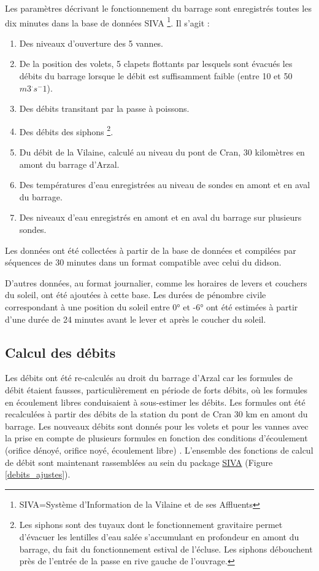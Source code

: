 \documentclass[11pt,twocolumn,titlepage,twoside]{article}
\begin{document}
Les paramètres décrivant le fonctionnement du barrage sont enregistrés toutes
les dix minutes dans la base de données SIVA \footnote{SIVA=Système
d'Information de la Vilaine et de ses Affluents}. Il s'agit :
\begin{enumerate}
\item Des niveaux d'ouverture des 5 vannes. 
\item De la position des volets, 5 clapets flottants par lesquels sont évacués
les débits du barrage lorsque le débit est suffisamment faible (entre 10 et 50 $m3^.s^-1$).
\item Des débits transitant par la
passe à poissons. 
\item Des débits des siphons \footnote{Les siphons sont des tuyaux dont le
fonctionnement gravitaire permet d'évacuer les lentilles d'eau salée
s'accumulant en profondeur en amont du barrage, du fait du fonctionnement
estival de l'écluse. Les siphons débouchent près de l'entrée de la passe en
rive gauche de l'ouvrage.}. 
\item Du débit de la Vilaine, calculé au niveau
du pont de Cran, 30 kilomètres en amont du barrage d'Arzal.
\item Des températures d'eau enregistrées au niveau de sondes en amont
et en aval du barrage.
\item Des niveaux d'eau enregistrés en amont et en aval du barrage sur plusieurs
sondes.
\end{enumerate}
Les données ont été collectées à partir de la base de données 
 et compilées par
séquences de 30 minutes dans un format compatible avec celui du didson.

D'autres données, au format journalier, comme les horaires de levers et couchers
du soleil, ont été ajoutées à cette base. Les durées de pénombre civile correspondant à une position
du soleil entre 0° et -6° ont été estimées à partir d'une durée de 24 minutes avant le lever 
et après le coucher du soleil.
\subsection{Calcul des débits}
Les débits ont été re-calculés au droit du barrage d'Arzal car les formules de
débit étaient fausses, particulièrement en période de forts débits, où
les formules en écoulement libres conduisaient à sous-estimer les
débits. Les formules ont été recalculées à partir des débits de la station du
pont de Cran 30 km en amont du barrage. Les nouveaux débits sont donnés pour les volets 
et pour les vannes avec la prise en compte de plusieurs formules en fonction des
conditions d'écoulement (orifice dénoyé, orifice noyé, écoulement libre)
\citep{briand_note_2015}. L'ensemble des fonctions de calcul de débit sont
maintenant rassemblées au sein du package
\href{https://github.com/Eaux-et-Vilaine/SIVA}{SIVA} (Figure \ref{debits_ajustes}).
\end{document}
